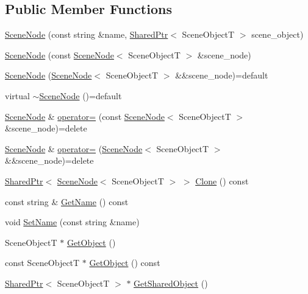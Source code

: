\subsection*{Public Member Functions}
\begin{DoxyCompactItemize}
\item 
\hyperlink{classmage_1_1_scene_node_afef93aec34dc43e60c18eaf1d89864be}{Scene\+Node} (const string \&name, \hyperlink{namespacemage_a1e01ae66713838a7a67d30e44c67703e}{Shared\+Ptr}$<$ Scene\+ObjectT $>$ scene\+\_\+object)
\item 
\hyperlink{classmage_1_1_scene_node_a5693f183f91055371196d07cbf077322}{Scene\+Node} (const \hyperlink{classmage_1_1_scene_node}{Scene\+Node}$<$ Scene\+ObjectT $>$ \&scene\+\_\+node)
\item 
\hyperlink{classmage_1_1_scene_node_a514dd7c8f0f80d8be133ede010833c6d}{Scene\+Node} (\hyperlink{classmage_1_1_scene_node}{Scene\+Node}$<$ Scene\+ObjectT $>$ \&\&scene\+\_\+node)=default
\item 
virtual \hyperlink{classmage_1_1_scene_node_a2a55b3b31cc8c9ba933d1e2559e4dbc7}{$\sim$\+Scene\+Node} ()=default
\item 
\hyperlink{classmage_1_1_scene_node}{Scene\+Node} \& \hyperlink{classmage_1_1_scene_node_a64c931d2d33ec110575b0a7659c41bdb}{operator=} (const \hyperlink{classmage_1_1_scene_node}{Scene\+Node}$<$ Scene\+ObjectT $>$ \&scene\+\_\+node)=delete
\item 
\hyperlink{classmage_1_1_scene_node}{Scene\+Node} \& \hyperlink{classmage_1_1_scene_node_a5fe1aa53e7ac43653483af8397ce78a9}{operator=} (\hyperlink{classmage_1_1_scene_node}{Scene\+Node}$<$ Scene\+ObjectT $>$ \&\&scene\+\_\+node)=delete
\item 
\hyperlink{namespacemage_a1e01ae66713838a7a67d30e44c67703e}{Shared\+Ptr}$<$ \hyperlink{classmage_1_1_scene_node}{Scene\+Node}$<$ Scene\+ObjectT $>$ $>$ \hyperlink{classmage_1_1_scene_node_a5cb20e0955c4afddcf7c2ecf79008e83}{Clone} () const
\item 
const string \& \hyperlink{classmage_1_1_scene_node_ab8245744de5c344b52fec0b2679caeb0}{Get\+Name} () const
\item 
void \hyperlink{classmage_1_1_scene_node_a9b77104eb1122ebb75fb5bba537bc967}{Set\+Name} (const string \&name)
\item 
Scene\+ObjectT $\ast$ \hyperlink{classmage_1_1_scene_node_a1c5f19002fe2b056673eb3c9dedf1bf1}{Get\+Object} ()
\item 
const Scene\+ObjectT $\ast$ \hyperlink{classmage_1_1_scene_node_a9efded16dbe61f16e498246ea3ba9095}{Get\+Object} () const
\item 
\hyperlink{namespacemage_a1e01ae66713838a7a67d30e44c67703e}{Shared\+Ptr}$<$ Scene\+ObjectT $>$ $\ast$ \hyperlink{classmage_1_1_scene_node_aee3e06bc2c0979f01678ee96149c2607}{Get\+Shared\+Object} ()
\end{DoxyCompactItemize}
